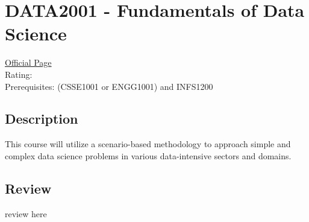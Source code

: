 \hypertarget{DATA2001}{\section{DATA2001 - Fundamentals of Data Science}}

\large
\textcolor{turbo_purple}{\href{https://my.uq.edu.au/programs-courses/course.html?course_code=DATA2001}{Official Page}} \\
Rating: \cstar\cstar\cstar\cstar\ostar \\
Prerequisites: (CSSE1001 or ENGG1001) and INFS1200

\normalsize
\subsection*{Description}
This course will utilize a scenario-based methodology to approach simple and complex data science problems in various data-intensive sectors and domains.

\subsection*{Review}
review here
